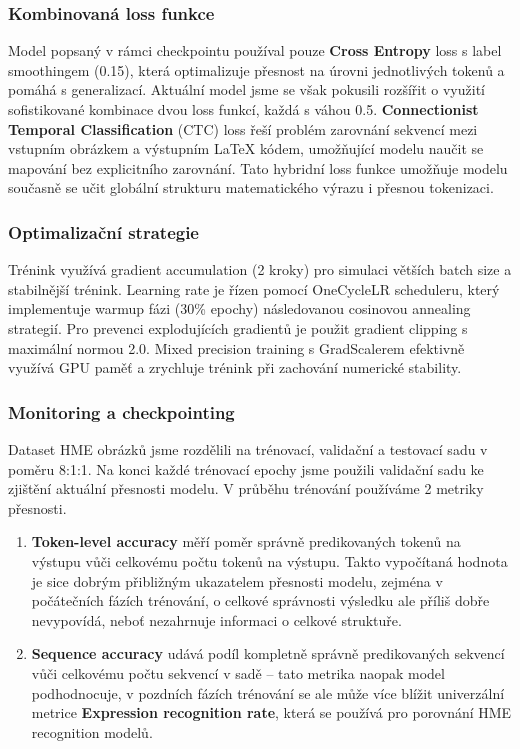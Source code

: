 \subsubsection{Kombinovaná loss funkce}
Model popsaný v rámci checkpointu používal pouze \textbf{Cross Entropy} loss s label smoothingem (0.15), která optimalizuje přesnost na úrovni jednotlivých tokenů a pomáhá s generalizací. Aktuální model jsme se však pokusili rozšířit o využití sofistikované kombinace dvou loss funkcí, každá s váhou 0.5. \textbf{Connectionist Temporal Classification} (CTC) loss řeší problém zarovnání sekvencí mezi vstupním obrázkem a výstupním LaTeX kódem, umožňující modelu naučit se mapování bez explicitního zarovnání. Tato hybridní loss funkce umožňuje modelu současně se učit globální strukturu matematického výrazu i přesnou tokenizaci.

\subsubsection{Optimalizační strategie}
Trénink využívá gradient accumulation (2 kroky) pro simulaci větších batch size a stabilnější trénink. Learning rate je řízen pomocí OneCycleLR scheduleru, který implementuje warmup fázi (30\% epochy) následovanou cosinovou annealing strategií. Pro prevenci explodujících gradientů je použit gradient clipping s maximální normou 2.0. Mixed precision training s GradScalerem efektivně využívá GPU paměť a zrychluje trénink při zachování numerické stability.


\subsubsection{Monitoring a checkpointing}

Dataset HME obrázků jsme rozdělili na trénovací, validační a testovací sadu v poměru 8:1:1. Na konci každé trénovací epochy jsme použili validační sadu ke zjištění aktuální přesnosti modelu. V průběhu trénování používáme 2 metriky přesnosti.

\begin{enumerate}
    \item \textbf{Token-level accuracy} měří poměr správně predikovaných tokenů na výstupu vůči celkovému počtu tokenů na výstupu. Takto vypočítaná hodnota je sice dobrým přibližným ukazatelem přesnosti modelu, zejména v počátečních fázích trénování, o celkové správnosti výsledku ale příliš dobře nevypovídá, neboť nezahrnuje informaci o celkové struktuře.
    \item \textbf{Sequence accuracy} udává podíl kompletně správně predikovaných sekvencí vůči celkovému počtu sekvencí v sadě -- tato metrika naopak model podhodnocuje, v pozdních fázích trénování se ale může více blížit univerzální metrice \textbf{Expression recognition rate}, která se používá pro porovnání HME recognition modelů.
\end{enumerate}

